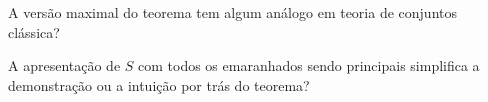   \begin{pergunta}
    A versão maximal do teorema tem algum análogo em teoria de conjuntos clássica?
  \end{pergunta}

    \begin{pergunta}
   A apresentação de $S$ com todos os emaranhados sendo principais simplifica a demonstração ou a intuição por trás do teorema?
  \end{pergunta}
  












